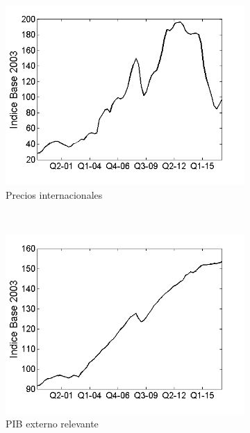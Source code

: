 \documentclass[12pt,letterpaper]{article}
\begin{document}
\begin{figure}
\begin{subfigure}[b]{0.4\textwidth}
    \end{subfigure}
    \begin{subfigure}[b]{0.4\textwidth}
        \includegraphics[width=\textwidth]{5ippbx}
        \caption{Precios internacionales}
        \label{5ippbx}
    \end{subfigure}
    ~ %
    \begin{subfigure}[b]{0.4\textwidth}
        \includegraphics[width=\textwidth]{2per}
        \caption{PIB externo relevante}
        \label{2per}
    \end{subfigure}
    \begin{subfigure}[b]{0.4\textwidth}

\end{subfigure}
\end{figure}
\end{document}
